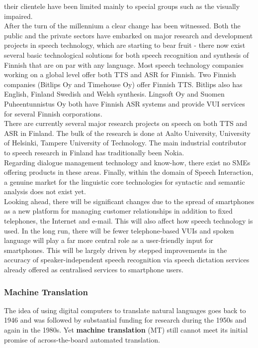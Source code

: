 \begin{multicols}{2}
their clientele have been limited mainly to special groups such as the visually
impaired.\\
After the turn of the millennium a clear change has been witnessed.
Both the public and the private sectors have embarked on major research and
development projects in speech technology, which are starting to bear fruit -
there now exist several basic technological solutions for both speech
recognition and synthesis of Finnish that are on par with any language. Most
speech technology companies working on a global level offer both TTS and ASR
for Finnish. Two Finnish companies (Bitlips Oy and Timehouse Oy) offer Finnish
TTS. Bitlips also has English, Finland Swedish and Welsh synthesis. Lingsoft Oy
and Suomen Puheentunnistus Oy both have Finnish ASR systems and provide VUI
services for several Finnish corporations.\\
There are currently several major research projects on speech on both TTS and
ASR in Finland. The bulk of the research is done at Aalto University,
University of Helsinki, Tampere University of Technology. The main industrial
contributor to speech research in Finland has traditionally been Nokia.\\
Regarding dialogue management technology and know-how, there exist no SMEs
offering products in these areas. Finally, within the domain of Speech
Interaction, a genuine market for the linguistic core technologies for
syntactic and semantic analysis does not exist yet.\\
Looking ahead, there will be significant changes due to the spread of
smartphones as a new platform for managing customer relationships in addition
to fixed telephones, the Internet and e-mail. This will also affect how speech
technology is used. In the long run, there will be fewer
telephone-based VUIs and spoken language will play a far more central role as a
user-friendly input for smartphones. This will be largely driven by stepped
improvements in the accuracy of speaker-independent speech recognition via
speech dictation services already offered as centralised services to smartphone
users.

\subsubsection{Machine Translation}

The idea of using digital computers to translate natural languages goes back to
1946 and was followed by substantial funding for research during the 1950s and
again in the 1980s. Yet \textbf{machine translation} (MT) still cannot meet its initial
promise of across-the-board automated translation.


\end{multicols}

